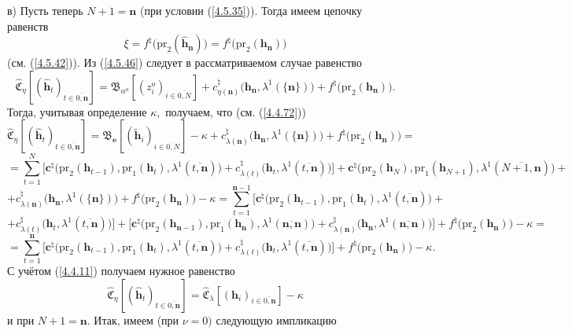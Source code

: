 \documentclass[12pt,twoside]{report}
\newcommand{\bfn}{\begin{equation}}
\newcommand{\efn}{\end{equation}}
\newcommand{\ov}{\overline}
\newcommand{\la}{\lambda}
\newcommand{\al}{\alpha}
\begin{document}
{{в) Пусть теперь $N+1 = \mathbf{n}$ (при  условии (\ref{4.5.35})). Тогда имеем цепочку равенств
\bfn\label{4.5.50}
\xi = f^\natural\bigl(\mathrm{pr}_2(\hat{\mathbf{h}}_\mathbf{n})\bigl) =
f^\natural\bigl(\mathrm{pr}_2(\mathbf{h}_\mathbf{n})\bigl)
\efn
(см. (\ref{4.5.42})). Из (\ref{4.5.46}) следует в рассматриваемом случае равенство
$$\widehat{\mathfrak{C}}_\eta[(\hat{\mathbf{h}}_t)_{t\in\ov{0,\mathbf{n}}}] =
\mathfrak{B}_{\al^o}[(z_i^o)_{i\in\ov{0,N}}] +
c_{\eta(\mathbf{n})}^\natural\bigl(\mathbf{h}_\mathbf{n},\la^1(\{\mathbf{n}\})\bigl) +
f^\natural\bigl(\mathrm{pr}_2(\mathbf{h}_\mathbf{n})\bigl).
$$
Тогда, учитывая определение $\kappa,$ получаем, что (см. (\ref{4.4.72}))
$$
\widehat{\mathfrak{C}}_\eta[(\hat{\mathbf{h}}_t)_{t\in\ov{0,\mathbf{n}}}] =
\mathfrak{B}_\mathbf{e}[(\tilde{\mathbf{h}}_i)_{i\in\ov{0,N}}] - \kappa +
c_{\la(\mathbf{n})}^\natural\bigl(\mathbf{h}_\mathbf{n},\la^1(\{\mathbf{n}\})\bigl) +
f^\natural\bigl(\mathrm{pr}_2(\mathbf{h}_\mathbf{n})\bigl) =
$$
$$
= \sum\limits_{t=1}^N\bigl[\mathbf{c}^\natural\bigl(\mathrm{pr}_2(\mathbf{h}_{t-1}),\mathrm{pr}_1
(\mathbf{h}_t), \la^1(\ov{t,\mathbf{n}})\bigl) + c_{\la(t)}^\natural\bigl(\mathbf{h}_t,
\la^1(\ov{t,\mathbf{n}})\bigl)\bigl] + \mathbf{c}^\natural\bigl(\mathrm{pr}_2(\mathbf{h}_N),
\mathrm{pr}_1(\mathbf{h}_{N+1}),
\la^1(\ov{N+1,\mathbf{n}})\bigl) +
$$
$$
+ c_{\la(\mathbf{n})}^\natural\bigl(\mathbf{h}_\mathbf{n},\la^1 (\{\mathbf{n}\})\bigl) +
f^\natural\bigl(\mathrm{pr}_2(\mathbf{h}_\mathbf{n})\bigl) -\kappa =
\sum\limits_{t=1}^{\mathbf{n}-1}\bigl[\mathbf{c}^\natural\bigl(\mathrm{pr}_2(\mathbf{h}_{t-1}),
\mathrm{pr}_1(\mathbf{h}_t), \la^1(\ov{t,\mathbf{n}})\bigl) +
$$
$$
+ c_{\la(t)}^\natural\bigl(\mathbf{h}_t,\la^1(\ov{t,\mathbf{n}})\bigl)\bigl] +
\bigl[\mathbf{c}^\natural\bigl(\mathrm{pr}_2(\mathbf{h}_{\mathbf{n}-1}),\mathrm{pr}_1
(\mathbf{h}_\mathbf{n}),\la^1(\ov{\mathbf{n},\mathbf{n}})\bigl) +
c_{\la(\mathbf{n})}^\natural\bigl(\mathbf{h}_\mathbf{n},\la^1(\ov{\mathbf{n},\mathbf{n}})\bigl)\bigl] +
f^\natural\bigl(\mathrm{pr}_2(\mathbf{h}_\mathbf{n})\bigl) - \kappa =
$$
$$
= \sum\limits_{t=1}^\mathbf{n}\bigl[\mathbf{c}^\natural\bigl(\mathrm{pr}_2(\mathbf{h}_{t-1}),
\mathrm{pr}_1(\mathbf{h}_t),\la^1(\ov{t,\mathbf{n}})\bigl) +
c_{\la(t)}^\natural\bigl(\mathbf{h}_t,\la^1(\ov{t,\mathbf{n}})\bigl)\bigl]
+f^\natural\bigl(\mathrm{pr}_2(\mathbf{h}_\mathbf{n})\bigl) - \kappa.
$$
С учётом (\ref{4.4.11}) получаем нужное равенство
$$
\widehat{\mathfrak{C}}_\eta[(\hat{\mathbf{h}}_t)_{t\in\ov{0,\mathbf{n}}}] =
\widehat{\mathfrak{C}}_\la[(\mathbf{h}_i)_{i\in\ov{0,\mathbf{n}}}] - \kappa
$$
и при $N+1 = \mathbf{n}.$ Итак, имеем (при $\nu = 0)$ следующую импликацию
}}
\end{document}
